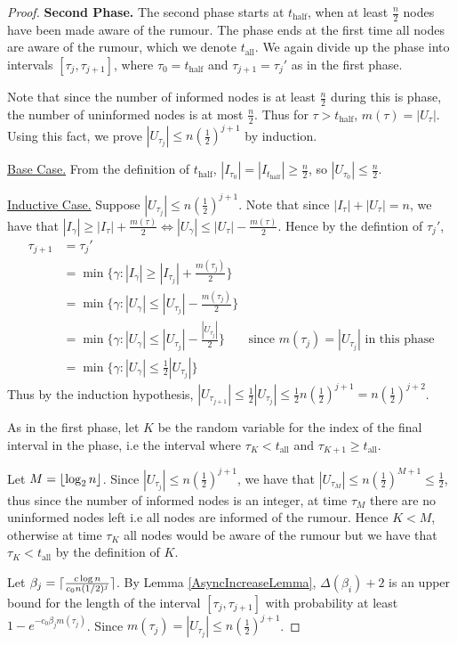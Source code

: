 \begin{proof}
	\textbf{Second Phase.} The second phase starts at $t_\text{half}$, when at least $\frac{n}{2}$ nodes have been made aware of the rumour. The phase ends at the first time all nodes are aware of the rumour, which we denote $t_\text{all}$. We again divide up the phase into intervals $[\tau_j, \tau_{j+1}]$, where $\tau_0 = t_\text{half}$ and $\tau_{j+1} = \tau_j'$ as in the first phase.

	Note that since the number of informed nodes is at least $\frac{n}{2}$ during this is phase, the number of uninformed nodes is at most $\frac{n}{2}$. Thus for $\tau > t_\text{half}$, $m(\tau) = |U_\tau|$. Using this fact, we prove $|U_{\tau_j}| \leq n(\frac{1}{2})^{j+1}$ by induction.

	\underline{Base Case.}
	From the definition of $t_\text{half}$, $|I_{\tau_0}| = |I_{t_\text{half}}| \geq \frac{n}{2}$, so $|U_{\tau_0}| \leq \frac{n}{2}$.

	\underline{Inductive Case.} Suppose $|U_{\tau_j}| \leq n(\frac{1}{2})^{j+1}$. Note that since $|I_\tau| + |U_\tau| = n$, we have that $|I_{\gamma}| \geq |I_\tau| + \frac{m(\tau)}{2} \iff |U_\gamma| \leq |U_\tau| - \frac{m(\tau)}{2}$. Hence by the defintion of $\tau_j'$,
	\begin{align*}
		\tau_{j+1} &= \tau_j' \\
		&= \min \{ \gamma : |I_\gamma| \geq |I_{\tau_j}| + \frac{m(\tau_j)}{2}\} \\
		&= \min \{ \gamma : |U_\gamma| \leq |U_{\tau_j}| - \frac{m(\tau_j)}{2}\} \\
		&= \min \{ \gamma : |U_\gamma| \leq |U_{\tau_j}| - \frac{|U_{\tau_j}|}{2}\} & \text{since } m(\tau_j) = |U_{\tau_j}| \text{ in this phase} \\
		&= \min \{ \gamma : |U_\gamma| \leq \frac{1}{2}|U_{\tau_j}|\}
	\end{align*}
	Thus by the induction hypothesis, $|U_{\tau_{j+1}}| \leq \frac{1}{2}|U_{\tau_j}| \leq \frac{1}{2}n(\frac{1}{2})^{j+1} = n(\frac{1}{2})^{j+2}$.

	As in the first phase, let $K$ be the random variable for the index of the final interval in the phase, i.e the interval where $\tau_K < t_\text{all}$ and $\tau_{K+1} \geq t_\text{all}$.

	Let $M = \lfloor\log_2 n\rfloor$. Since $|U_{\tau_j}| \leq n(\frac{1}{2})^{j+1}$, we have that $|U_{\tau_M}| \leq n(\frac{1}{2})^{M+1} \leq \frac{1}{2}$, thus since the number of informed nodes is an integer, at time $\tau_M$ there are no uninformed nodes left i.e all nodes are informed of the rumour. Hence $K < M$, otherwise at time $\tau_K$ all nodes would be aware of the rumour but we have that $\tau_K < t_\text{all}$ by the definition of $K$.

	Let $\beta_j = \lceil\frac{c \log n}{c_0 n(1/2)^j}\rceil$. %
	By Lemma \ref{AsyncIncreaseLemma}, $\Delta(\beta_i) + 2$ is an upper bound for the length of the interval $[\tau_j, \tau_{j+1}]$ 
	with probability at least $1 - e^{-c_0\beta_j m(\tau_j)}$. %
	Since $m(\tau_j) = |U_{\tau_j}| \leq n(\frac{1}{2})^{j+1}$. %

\end{proof}

